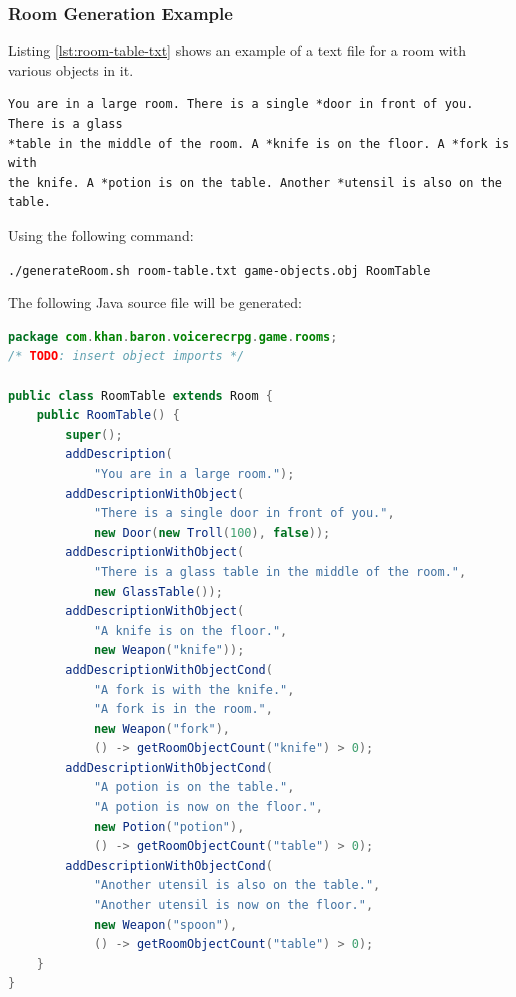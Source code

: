 \documentclass[11pt]{article}
\begin{document}
\subsubsection{Room Generation Example}

Listing \ref{lst:room-table-txt} shows an example of a text file for a room with various objects in it.

\begin{lstlisting}[caption=room-table.txt, label=lst:room-table-txt]
You are in a large room. There is a single *door in front of you. There is a glass
*table in the middle of the room. A *knife is on the floor. A *fork is with
the knife. A *potion is on the table. Another *utensil is also on the table.
\end{lstlisting}

Using the following command:

\begin{center}
\texttt{./generateRoom.sh room-table.txt game-objects.obj RoomTable}
\end{center}

The following Java source file will be generated:

\begin{lstlisting}[language=Java, label=lst:room-table-java]
package com.khan.baron.voicerecrpg.game.rooms;
/* TODO: insert object imports */

public class RoomTable extends Room {
    public RoomTable() {
        super();
        addDescription(
            "You are in a large room.");
        addDescriptionWithObject(
            "There is a single door in front of you.",
            new Door(new Troll(100), false));
        addDescriptionWithObject(
            "There is a glass table in the middle of the room.",
            new GlassTable());
        addDescriptionWithObject(
            "A knife is on the floor.",
            new Weapon("knife"));
        addDescriptionWithObjectCond(
            "A fork is with the knife.",
            "A fork is in the room.",
            new Weapon("fork"),
            () -> getRoomObjectCount("knife") > 0);
        addDescriptionWithObjectCond(
            "A potion is on the table.",
            "A potion is now on the floor.",
            new Potion("potion"),
            () -> getRoomObjectCount("table") > 0);
        addDescriptionWithObjectCond(
            "Another utensil is also on the table.",
            "Another utensil is now on the floor.",
            new Weapon("spoon"),
            () -> getRoomObjectCount("table") > 0);
    }
}
\end{lstlisting}
\end{document}
